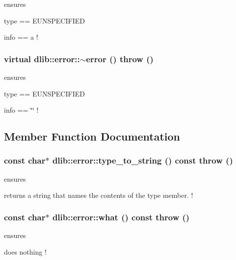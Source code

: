 \label{classdlib_1_1error_a7aa811457dae46c97d8b9ecc696b0559}
ensures
\begin{DoxyItemize}
\item type == EUNSPECIFIED
\item info == a ! 
\end{DoxyItemize}\hypertarget{classdlib_1_1error_ab9a83be4747253f0450091206efa901f}{
\subsubsection[{$\sim$error}]{\setlength{\rightskip}{0pt plus 5cm}virtual dlib::error::$\sim$error ()  throw ()}}
\label{classdlib_1_1error_ab9a83be4747253f0450091206efa901f}
ensures
\begin{DoxyItemize}
\item type == EUNSPECIFIED
\item info == \char`\"{}\char`\"{} ! 
\end{DoxyItemize}

\subsection{Member Function Documentation}
\hypertarget{classdlib_1_1error_aa45c616e14dd55887ad8b6f8b7b2e9aa}{
\subsubsection[{type\_\-to\_\-string}]{\setlength{\rightskip}{0pt plus 5cm}const char$\ast$ dlib::error::type\_\-to\_\-string () const  throw ()}}
\label{classdlib_1_1error_aa45c616e14dd55887ad8b6f8b7b2e9aa}
ensures
\begin{DoxyItemize}
\item returns a string that names the contents of the type member. ! 
\end{DoxyItemize}\hypertarget{classdlib_1_1error_a5f469c24dbcb32b0f83f66ded3609e92}{
\subsubsection[{what}]{\setlength{\rightskip}{0pt plus 5cm}const char$\ast$ dlib::error::what () const  throw ()}}
\label{classdlib_1_1error_a5f469c24dbcb32b0f83f66ded3609e92}
ensures
\begin{DoxyItemize}
\item does nothing !
\end{DoxyItemize}

